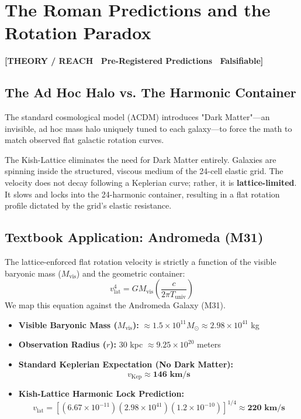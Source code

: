 \documentclass[11pt, letterpaper, openany]{book}
\begin{document}
\chapter{The Roman Predictions and the Rotation Paradox}

\begin{center}
{\color{theorytag}\textbf{[THEORY / REACH \textbullet\ Pre-Registered Predictions \textbullet\ Falsifiable]}}
\end{center}

\section{The Ad Hoc Halo vs. The Harmonic Container}

The standard cosmological model (ΛCDM) introduces "Dark Matter"—an invisible, ad hoc mass halo uniquely tuned to each galaxy—to force the math to match observed flat galactic rotation curves.

The Kish-Lattice eliminates the need for Dark Matter entirely. Galaxies are spinning inside the structured, viscous medium of the 24-cell elastic grid. The velocity does not decay following a Keplerian curve; rather, it is \textbf{lattice-limited}. It slows and locks into the 24-harmonic container, resulting in a flat rotation profile dictated by the grid's elastic resistance.

\section{Textbook Application: Andromeda (M31)}

The lattice-enforced flat rotation velocity is strictly a function of the visible baryonic mass ($M_{\text{vis}}$) and the geometric container:
\[
v_{\text{lat}}^4 = G M_{\text{vis}} \left( \frac{c}{2\pi T_{\text{univ}}} \right)
\]
We map this equation against the Andromeda Galaxy (M31).

\begin{itemize}
    \item \textbf{Visible Baryonic Mass ($M_{\text{vis}}$):} $\approx 1.5 \times 10^{11} M_\odot \approx 2.98 \times 10^{41}$ kg
    \item \textbf{Observation Radius ($r$):} 30 kpc $\approx 9.25 \times 10^{20}$ meters
    \item \textbf{Standard Keplerian Expectation (No Dark Matter):} 
    \[
    v_{\text{Kep}} \approx \mathbf{146 \text{ km/s}}
    \]
    \item \textbf{Kish-Lattice Harmonic Lock Prediction:}
    \[
    v_{\text{lat}} = \left[ (6.67 \times 10^{-11})(2.98 \times 10^{41})(1.2 \times 10^{-10}) \right]^{1/4} \approx \mathbf{220 \text{ km/s}}
    \]
\end{itemize}
\end{document}
